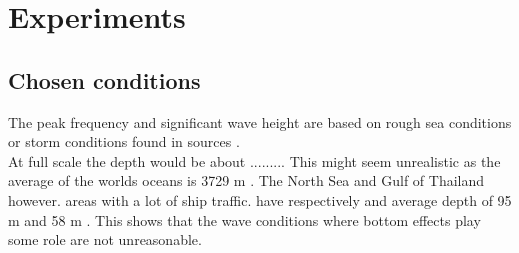 \section{Experiments}
\label{sec:exp}

\subsection{Chosen conditions}
\label{sec:exp_conditions}
The peak frequency and significant wave height are based on rough sea conditions or storm conditions found in sources \cite{Deelen2014, Mazaheri2019, Collins2018, Techet2005}. \\

At full scale the depth would be about ......... This might seem unrealistic as the average of the worlds oceans is 3729 m \cite{Zeecijfers}. The North Sea and Gulf of Thailand however. areas with a lot of ship traffic. have respectively and average depth of 95 m \cite{NorthSeaDepth} and 58 m \cite{Khongchai2003}. This shows that the wave conditions where bottom effects play some role are not unreasonable.

